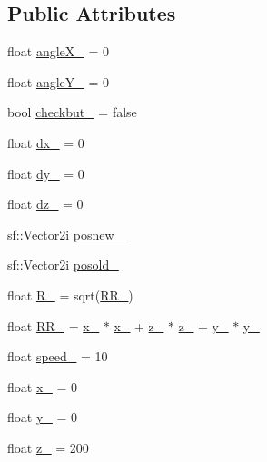 \subsection*{Public Attributes}
\begin{DoxyCompactItemize}
\item 
float \hyperlink{classmouse__t_a3bb043fbb3ebcffd8768ecd70adda576}{angle\+X\+\_\+} = 0
\item 
float \hyperlink{classmouse__t_aca49d667f44432535d37f5ee683fc690}{angle\+Y\+\_\+} = 0
\item 
bool \hyperlink{classmouse__t_a456b0dc2525354ab40c070179583cd4a}{checkbut\+\_\+} = false
\item 
float \hyperlink{classmouse__t_ab4c5208e4a5c5683decea04c15d018c6}{dx\+\_\+} = 0
\item 
float \hyperlink{classmouse__t_a736990a18878651b2214f1c780d4e66a}{dy\+\_\+} = 0
\item 
float \hyperlink{classmouse__t_a5728af521e32a9123640d03abe2ea001}{dz\+\_\+} = 0
\item 
sf\+::\+Vector2i \hyperlink{classmouse__t_a36e5d135625eb578cad8ebb7cb6a1294}{posnew\+\_\+}
\item 
sf\+::\+Vector2i \hyperlink{classmouse__t_a2db1a7bf88213de4b022aa1260e9f71e}{posold\+\_\+}
\item 
float \hyperlink{classmouse__t_a8c4c59a5c03edf37b4e8663bf1ac8864}{R\+\_\+} = sqrt(\hyperlink{classmouse__t_acf93a98758b45159dbd34c6a2c71d122}{R\+R\+\_\+})
\item 
float \hyperlink{classmouse__t_acf93a98758b45159dbd34c6a2c71d122}{R\+R\+\_\+} = \hyperlink{classmouse__t_a902ac86b499a19c0cd4405d18bf03551}{x\+\_\+} $\ast$ \hyperlink{classmouse__t_a902ac86b499a19c0cd4405d18bf03551}{x\+\_\+} + \hyperlink{classmouse__t_a42626aabbe4860f2e6bb5e0e840c8e1d}{z\+\_\+} $\ast$ \hyperlink{classmouse__t_a42626aabbe4860f2e6bb5e0e840c8e1d}{z\+\_\+} + \hyperlink{classmouse__t_ac026f8fee6095db0f1867db5c250b83f}{y\+\_\+} $\ast$ \hyperlink{classmouse__t_ac026f8fee6095db0f1867db5c250b83f}{y\+\_\+}
\item 
float \hyperlink{classmouse__t_a6bcf637aa4f03937954c7e26c6123c7c}{speed\+\_\+} = 10
\item 
float \hyperlink{classmouse__t_a902ac86b499a19c0cd4405d18bf03551}{x\+\_\+} = 0
\item 
float \hyperlink{classmouse__t_ac026f8fee6095db0f1867db5c250b83f}{y\+\_\+} = 0
\item 
float \hyperlink{classmouse__t_a42626aabbe4860f2e6bb5e0e840c8e1d}{z\+\_\+} = 200
\end{DoxyCompactItemize}


